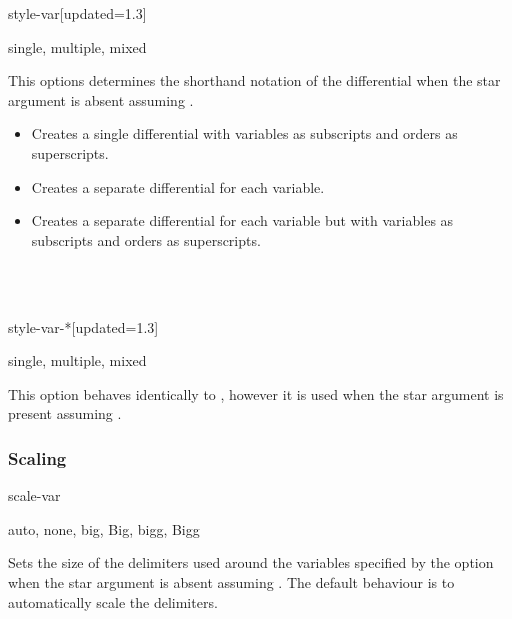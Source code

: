 \begin{option}{style-var}[updated=1.3]
	\begin{values}[default = multiple]
		single, multiple, mixed
	\end{values}
	This options determines the shorthand notation of the differential when the star argument is absent assuming .
	\begin{itemize}[widest = {}, leftmargin =*]
		\item[\val{single}] Creates a single differential with variables as subscripts and orders as superscripts.
		\item[\val{multiple}] Creates a separate differential for each variable.
		\item[\val{mixed}] Creates a separate differential for each variable but with variables as subscripts and orders as superscripts.
	\end{itemize}
	\begin{example}
		 \\
		 \\
	\end{example}
\end{option}

\begin{option}{style-var-*}[updated=1.3]
	\begin{values}[default = single]
		single, multiple, mixed
	\end{values}
	This option behaves identically to , however it is used when the star argument is present assuming \keyval{switch-*}{false}.
\end{option}

\subsubsection*{Scaling}

\begin{option}{scale-var}
	\begin{values}[default = auto]
		auto, none, big, Big, bigg, Bigg
	\end{values}
	Sets the size of the delimiters used around the variables specified by the  option when the star argument is absent assuming . The default behaviour is to automatically scale the delimiters.
	\begin{example}
		\odif[scale-var=none, var]{r,\theta,\varphi}\\
		\odif[scale-var=Big, var]{r,\theta,\varphi}
	\end{example}
\end{option}

